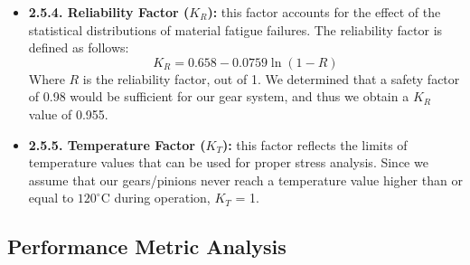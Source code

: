 \documentclass[letterpaper,12pt]{article}
\begin{document}
\begin{itemize}[leftmargin=3mm]
    \item \textbf{2.5.4. Reliability Factor ($K_R$):} this factor accounts for the effect of the statistical distributions of material fatigue failures. The reliability factor is defined as follows:
    \begin{equation}
    K_R = 0.658-0.0759\ln{(1-R)}
    \end{equation}
    Where $R$ is the reliability factor, out of 1. We determined that a safety factor of 0.98 would be sufficient for our gear system, and thus we obtain a $K_R$ value of 0.955.
    
    \item \textbf{2.5.5. Temperature Factor ($K_T$):} this factor reflects the limits of temperature values that can be used for proper stress analysis. Since we assume that our gears/pinions never reach a temperature value higher than or equal to $120^\circ$C during operation, $K_T$ = 1.
\end{itemize}

\subsection{Performance Metric Analysis}
\end{document}
